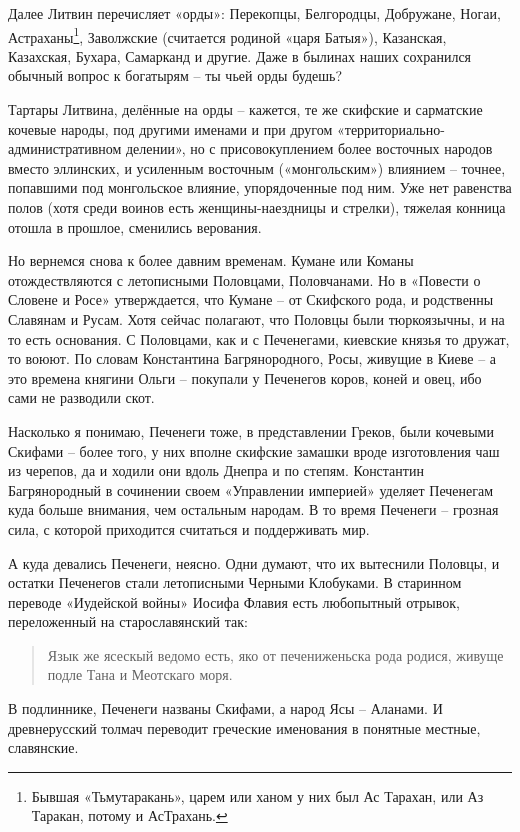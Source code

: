 Далее Литвин перечисляет «орды»: Перекопцы, Белгородцы, Добружане, Ногаи, Астраханы\footnote{Бывшая «Тьмутаракань», царем или ханом у них был Ас Тарахан, или Аз Таракан, потому и АсТрахань.}, Заволжские (считается родиной «царя Батыя»), Казанская, Казахская, Бухара, Самарканд и другие. Даже в былинах наших сохранился обычный вопрос к богатырям  – ты чьей орды будешь? 

Тартары Литвина, делённые на орды – кажется, те же скифские и сарматские кочевые народы, под другими именами и при другом «территориально-административ\-ном делении», но с присовокуплением более восточных народов вместо эллинских, и усиленным восточным («монгольским») влиянием – точнее, попавшими под монгольское влияние, упорядоченные под ним. Уже нет равенства полов (хотя среди воинов есть женщины-наездницы и стрелки), тяжелая конница отошла в прошлое, сменились верования.

Но вернемся снова к более давним временам. Кумане или Команы отождествляются с летописными Половцами, Половчанами. Но в «Повести о Словене и Росе» утверждается, что Кумане – от Скифского рода, и родственны Славянам и Русам. Хотя сейчас полагают, что Половцы были тюркоязычны, и на то есть основания. С Половцами, как и с Печенегами, киевские князья то дружат, то воюют. По словам Константина Багрянородного, Росы, живущие в Киеве – а это времена княгини Ольги – покупали у Печенегов коров, коней и овец, ибо сами не разводили скот.

Насколько я понимаю, Печенеги тоже, в представлении Греков, были кочевыми Скифами – более того, у них вполне скифские замашки вроде изготовления чаш из черепов, да и ходили они вдоль Днепра и по степям. Константин Багрянородный в сочинении своем «Управлении империей» уделяет Печенегам куда больше внимания, чем остальным народам. В то время Печенеги – грозная сила, с которой приходится считаться и поддерживать мир.

А куда девались Печенеги, неясно. Одни думают, что их вытеснили Половцы, и остатки Печенегов стали летописными Черными Клобуками. В старинном переводе «Иудейской войны» Иосифа Флавия есть любопытный отрывок, переложенный на старославянский так:

\begin{quotation}
Язык же ясескый ведомо есть, яко от печениженьска рода родися, живуще подле Тана и Меотскаго моря. 
\end{quotation}

В подлиннике, Печенеги названы Скифами, а народ Ясы – Аланами. И древнерусский толмач переводит греческие именования в понятные местные, славянские.

